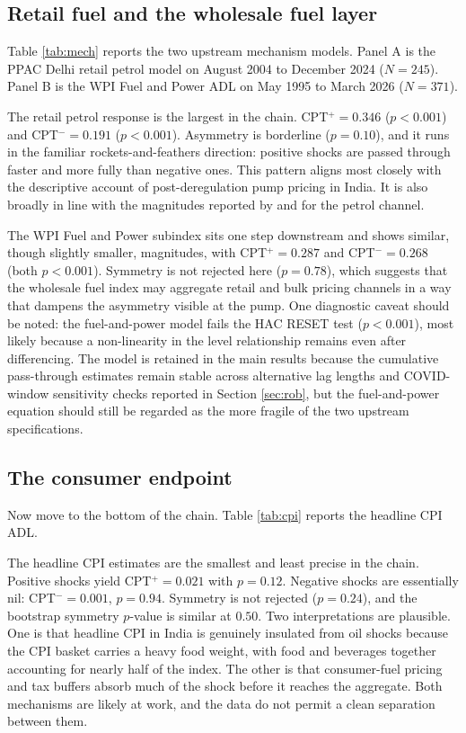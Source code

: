 \documentclass[11pt,a4paper]{article}
\begin{document}
\subsection{Retail fuel and the wholesale fuel layer}

Table \ref{tab:mech} reports the two upstream mechanism models. Panel A is the PPAC Delhi retail petrol model on August 2004 to December 2024 ($N=245$). Panel B is the WPI Fuel and Power ADL on May 1995 to March 2026 ($N=371$).



The retail petrol response is the largest in the chain. CPT$^+ = 0.346$ ($p < 0.001$) and CPT$^- = 0.191$ ($p < 0.001$). Asymmetry is borderline ($p = 0.10$), and it runs in the familiar rockets-and-feathers direction: positive shocks are passed through faster and more fully than negative ones. This pattern aligns most closely with the descriptive account of post-deregulation pump pricing in India. It is also broadly in line with the magnitudes reported by \citet{deheri2024} and \citet{pradeep2022} for the petrol channel.

The WPI Fuel and Power subindex sits one step downstream and shows similar, though slightly smaller, magnitudes, with CPT$^+ = 0.287$ and CPT$^- = 0.268$ (both $p < 0.001$). Symmetry is not rejected here ($p = 0.78$), which suggests that the wholesale fuel index may aggregate retail and bulk pricing channels in a way that dampens the asymmetry visible at the pump. One diagnostic caveat should be noted: the fuel-and-power model fails the HAC RESET test ($p < 0.001$), most likely because a non-linearity in the level relationship remains even after differencing. The model is retained in the main results because the cumulative pass-through estimates remain stable across alternative lag lengths and COVID-window sensitivity checks reported in Section \ref{sec:rob}, but the fuel-and-power equation should still be regarded as the more fragile of the two upstream specifications.

\subsection{The consumer endpoint}

Now move to the bottom of the chain. Table \ref{tab:cpi} reports the headline CPI ADL.



The headline CPI estimates are the smallest and least precise in the chain. Positive shocks yield CPT$^+ = 0.021$ with $p = 0.12$. Negative shocks are essentially nil: CPT$^- = 0.001$, $p = 0.94$. Symmetry is not rejected ($p = 0.24$), and the bootstrap symmetry $p$-value is similar at $0.50$. Two interpretations are plausible. One is that headline CPI in India is genuinely insulated from oil shocks because the CPI basket carries a heavy food weight, with food and beverages together accounting for nearly half of the index. The other is that consumer-fuel pricing and tax buffers absorb much of the shock before it reaches the aggregate. Both mechanisms are likely at work, and the data do not permit a clean separation between them.
\end{document}
